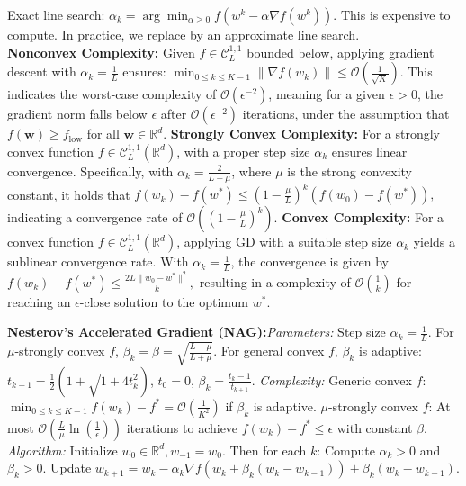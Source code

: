 \documentclass[a4paper,6pt]{extarticle}
\begin{document}
\begin{multicols}{2}
{            Exact line search: $\alpha_k = \arg\min_{\alpha \geq 0} f(w^k - \alpha \nabla f(w^k))$. This is expensive to compute. In practice, we replace by an approximate line search.\\

            \textbf{Nonconvex Complexity:}
            Given $f \in \mathcal{C}_L^{1,1}$ bounded below, applying gradient descent with $\alpha_k=\frac{1}{L}$ ensures:
            $\min _{0 \leq k \leq K-1}\left\|\nabla f\left(w_k\right)\right\| \leq \mathcal{O}\left(\frac{1}{\sqrt{K}}\right).$
            This indicates the worst-case complexity of $\mathcal{O}\left(\epsilon^{-2}\right)$, meaning for a given $\epsilon>0$, the gradient norm falls below $\epsilon$ after $\mathcal{O}\left(\epsilon^{-2}\right)$ iterations, under the assumption that $f(\boldsymbol{w}) \geq f_{\text{low}}$ for all $\boldsymbol{w} \in \mathbb{R}^d$.
            \textbf{Strongly Convex Complexity:}
            For a strongly convex function $f \in \mathcal{C}_L^{1,1}\left(\mathbb{R}^d\right)$, with a proper step size $\alpha_k$ ensures linear convergence. Specifically, with $\alpha_k=\frac{2}{L+\mu}$, where $\mu$ is the strong convexity constant, it holds that
            $f(w_k) - f(w^*) \leq \left(1 - \frac{\mu}{L}\right)^k (f(w_0) - f(w^*)),$
            indicating a convergence rate of $\mathcal{O}\left(\left(1 - \frac{\mu}{L}\right)^k\right)$.
            \textbf{Convex Complexity:}
            For a convex function $f \in \mathcal{C}_L^{1,1}\left(\mathbb{R}^d\right)$, applying GD with a suitable step size $\alpha_k$ yields a sublinear convergence rate. With $\alpha_k = \frac{1}{L}$, the convergence is given by $f(w_k) - f(w^*) \leq \frac{2L\|w_0 - w^*\|^2}{k},$
            resulting in a complexity of $\mathcal{O}\left(\frac{1}{k}\right)$ for reaching an $\epsilon$-close solution to the optimum $w^*$.

            \textbf{Nesterov's Accelerated Gradient (NAG):}\textit{Parameters:} Step size $\alpha_k = \frac{1}{L}$. For $\mu$-strongly convex $f$, $\beta_k = \beta = \sqrt{\frac{L-\mu}{L+\mu}}$. For general convex $f$, $\beta_k$ is adaptive: $t_{k+1} = \frac{1}{2}\left(1 + \sqrt{1 + 4t_k^2}\right)$, $t_0 = 0$, $\beta_k = \frac{t_k - 1}{t_{k+1}}$. \textit{Complexity:} Generic convex $f$: $\min_{0 \leq k \leq K-1} f(w_k) - f^* = \mathcal{O}\left(\frac{1}{K^2}\right)$ if $\beta_k$ is adaptive. $\mu$-strongly convex $f$: At most $\mathcal{O}\left(\frac{L}{\mu}\ln\left(\frac{1}{\epsilon}\right)\right)$ iterations to achieve $f(w_k) - f^* \leq \epsilon$ with constant $\beta$. \textit{Algorithm:}
            Initialize $w_0 \in \mathbb{R}^d, w_{-1} = w_0$. Then for each $k$: Compute $\alpha_k > 0$ and $\beta_k > 0$. Update $w_{k+1} = w_k - \alpha_k \nabla f(w_k + \beta_k (w_k - w_{k-1})) + \beta_k (w_k - w_{k-1})$.

}
\end{multicols}
\end{document}
